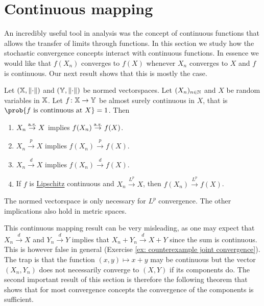 \section[Continuous mapping]{Continuous mapping }
\label{sec: continuous mapping}

An incredibly useful tool in analysis was the concept of continuous functions
that allows the transfer of limits through functions. In this section
we study how the stochastic convergence concepts interact with continuous
functions. In essence we would like that \(f(X_n)\) converges to \(f(X)\)
whenever \(X_n\) converges to \(X\) and \(f\) is continuous.
Our next result shows that this is mostly the case.

\begin{mdframed}[innertopmargin=0pt]
\begin{theorem}
    \label{thm: continuous mapping}
    Let \((\mathbb{X}, \lVert\cdot\rVert)\) and \((\mathbb{Y}, \lVert\cdot\rVert)\) be normed
    vectorspaces.  Let \((X_n)_{n\in \mathbb{N}}\) and \(X\) be random variables in
    \(\mathbb{X}\). Let \(f\colon \mathbb{X} \to \mathbb{Y}\) be almost
    surely continuous in \(X\), that is \(\prob{f \text{ is continuous at } X} =
    1\). Then
    \begin{enumerate}[label=(\roman*)]
        \item\label{it: cont. mapping as} \(X_n \overset{\operatorname{\text{a.s.}}}\to X\) implies \(f(X_n) \overset{\operatorname{\text{a.s.}}}\to f(X)\).
        \item\label{it: cont. mapping p} \(X_n \overset{p}\to X\) implies \(f(X_n) \overset{p}\to f(X)\).
        \item\label{it: cont. mapping d} \(X_n \overset{d}\to X\) implies \(f(X_n) \overset{d}\to f(X)\).
        \item\label{it: cont. mapping Lp} If \(f\) is \underline{Lipschitz} continuous and \(X_n \overset{L^p}\to X\),
        then \(f(X_n) \overset{L^p}\to f(X)\).
    \end{enumerate}
\end{theorem}
\end{mdframed}

\begin{remark}[Generalization]
    The normed vectorspace is only necessary for \(L^p\) convergence. The other
    implications also hold in metric spaces.
\end{remark}

This continuous mapping result can be very misleading, as one may expect that
\(X_n \overset{d} \to X\) and \(Y_n \overset{d} \to Y\) implies that \(X_n + Y_n
\overset{d} \to X + Y\) since the sum is continuous. This is however
false in general (Exercise \ref{ex: counterexample joint convergence}).
The trap is that the function \((x,y) \mapsto x+y\) may be continuous
but the vector \((X_n, Y_n)\) does not necessarily converge to \((X,Y)\)
if its components do. The second important result of this section
is therefore the following theorem that shows that for most convergence
concepts the convergence of the components is sufficient.


